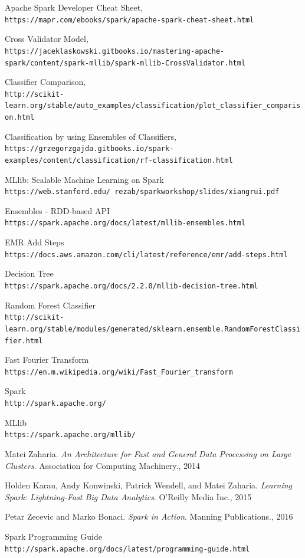 \documentclass{neu_handout}
\begin{document}
\begin{thebibliography}{9}
Apache Spark Developer Cheat Sheet,
\\\texttt{https://mapr.com/ebooks/spark/apache-spark-cheat-sheet.html}

Cross Validator Model,
\\\texttt{https://jaceklaskowski.gitbooks.io/mastering-apache-spark/content/spark-mllib/spark-mllib-CrossValidator.html}

Classifier Comparison,
\\\texttt{http://scikit-learn.org/stable/auto\_examples/classification/plot\_classifier\_comparison.html}

Classification by using Ensembles of Classifiers,
\\\texttt{https://grzegorzgajda.gitbooks.io/spark-examples/content/classification/rf-classification.html}


MLlib: Scalable Machine Learning on Spark
\\\texttt{https://web.stanford.edu/~rezab/sparkworkshop/slides/xiangrui.pdf}


Ensembles - RDD-based API
\\\texttt{https://spark.apache.org/docs/latest/mllib-ensembles.html}

EMR Add Steps
\\\texttt{https://docs.aws.amazon.com/cli/latest/reference/emr/add-steps.html}

Decision Tree
\\\texttt{https://spark.apache.org/docs/2.2.0/mllib-decision-tree.html}

Random Forest Classifier
\\\texttt{http://scikit-learn.org/stable/modules/generated/sklearn.ensemble.RandomForestClassifier.html}

Fast Fourier Transform
\\\texttt{https://en.m.wikipedia.org/wiki/Fast\_Fourier\_transform}

Spark
\\\texttt{http://spark.apache.org/}

MLlib
\\\texttt{https://spark.apache.org/mllib/}

 Matei Zaharia. \textsl{An Architecture for Fast and General Data Processing on
Large Clusters}. Association for Computing Machinery., 2014

 Holden Karau, Andy Konwinski, Patrick Wendell, and Matei Zaharia. \textsl{Learning Spark: Lightning-Fast Big Data Analytics}. O'Reilly Media Inc., 2015

 Petar Zecevic and Marko Bonaci. \textsl{Spark in Action}. Manning
Publications., 2016

Spark Programming Guide
\\\texttt{http://spark.apache.org/docs/latest/programming-guide.html}

\end{thebibliography}
\end{document}

